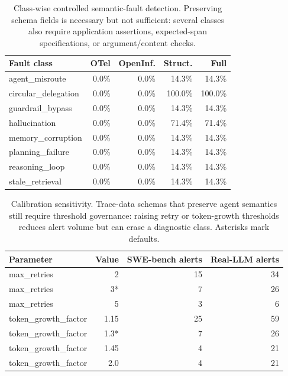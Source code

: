 \documentclass[conference]{IEEEtran}
\begin{document}
\begin{table}[t]
\centering
\scriptsize
\caption{Class-wise controlled semantic-fault detection. Preserving
schema fields is necessary but not sufficient: several classes also
require application assertions, expected-span specifications, or
argument/content checks.}
\label{tab:classwise}
\begin{tabular}{@{}lrrrr@{}}
\toprule
Fault class & OTel & OpenInf. & Struct. & Full \\
\midrule
agent\_misroute & 0.0\% & 0.0\% & 14.3\% & 14.3\% \\
circular\_delegation & 0.0\% & 0.0\% & 100.0\% & 100.0\% \\
guardrail\_bypass & 0.0\% & 0.0\% & 14.3\% & 14.3\% \\
hallucination & 0.0\% & 0.0\% & 71.4\% & 71.4\% \\
memory\_corruption & 0.0\% & 0.0\% & 14.3\% & 14.3\% \\
planning\_failure & 0.0\% & 0.0\% & 14.3\% & 14.3\% \\
reasoning\_loop & 0.0\% & 0.0\% & 14.3\% & 14.3\% \\
stale\_retrieval & 0.0\% & 0.0\% & 14.3\% & 14.3\% \\
\bottomrule
\end{tabular}
\end{table}

\begin{table}[t]
\centering
\scriptsize
\caption{Calibration sensitivity. Trace-data schemas that preserve agent
semantics still require threshold governance: raising retry or
token-growth thresholds reduces alert volume but can erase a diagnostic
class. Asterisks mark defaults.}
\label{tab:calibration}
\begin{tabular}{@{}lrrr@{}}
\toprule
Parameter & Value & SWE-bench alerts & Real-LLM alerts \\
\midrule
max\_retries & 2 & 15 & 34 \\
max\_retries & 3* & 7 & 26 \\
max\_retries & 5 & 3 & 6 \\
token\_growth\_factor & 1.15 & 25 & 59 \\
token\_growth\_factor & 1.3* & 7 & 26 \\
token\_growth\_factor & 1.45 & 4 & 21 \\
token\_growth\_factor & 2.0 & 4 & 21 \\
\bottomrule
\end{tabular}
\end{table}
\end{document}
